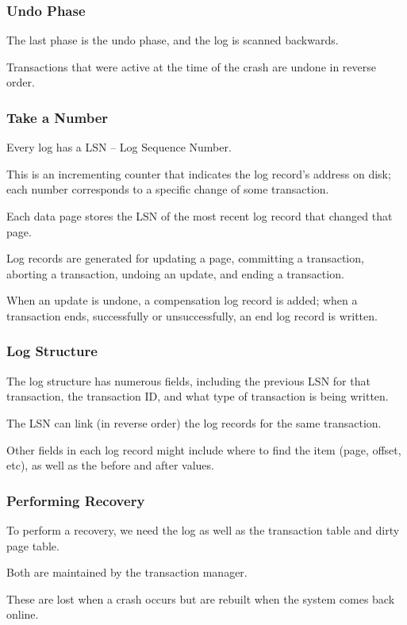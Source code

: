 \begin{frame}
\frametitle{Undo Phase}

The last phase is the undo phase, and the log is scanned backwards.

Transactions that were active at the time of the crash are undone in reverse order. 


\end{frame}

\begin{frame}
\frametitle{Take a Number}

Every log has a LSN -- \alert{Log Sequence Number}. 

This is an incrementing counter that indicates the log record's address on disk; each number corresponds to a specific change of some transaction. 

Each data page stores the LSN of the most recent log record that changed that page. 

Log records are generated for updating a page, committing a transaction, aborting a transaction, undoing an update, and ending a transaction. 

When an update is undone, a compensation log record is added; when a transaction ends, successfully or unsuccessfully, an end log record is written.
\end{frame}



\begin{frame}
\frametitle{Log Structure}

The log structure has numerous fields, including the previous LSN for that transaction, the transaction ID, and what type of transaction is being written. 

The LSN can link (in reverse order) the log records for the same transaction. 

Other fields in each log record might include where to find the item (page, offset, etc), as well as the before and after values.


\end{frame}


\begin{frame}
\frametitle{Performing Recovery}

To perform a recovery, we need the log as well as the \alert{transaction table} and \alert{dirty page table}.

Both are maintained by the transaction manager.

These are lost when a crash occurs but are rebuilt when the system comes back online.

\end{frame}

